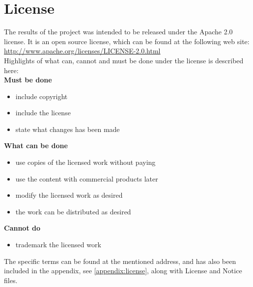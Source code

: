 \section{License}
The results of the project was intended to be released under the Apache 2.0 license. It is an open source license, which can be found  at the following web site: \url{http://www.apache.org/licenses/LICENSE-2.0.html}\\
Highlights of what can, cannot and must be done under the license is described here:\\
\textbf{Must be done}
\begin{itemize}
\item include copyright
\item include the license
\item state what changes has been made
\end{itemize}
\textbf{What can be done}
\begin{itemize}
\item use copies of the licensed work without paying
\item use the content with commercial products later
\item modify the licensed work as desired
\item the work can be distributed as desired
\end{itemize}
\textbf{Cannot do}
\begin{itemize}
\item trademark the licensed work
\end{itemize}
The specific terms can be found at the mentioned address, and has also been included in the appendix, see \ref{appendix:license}, along with License and Notice files.

